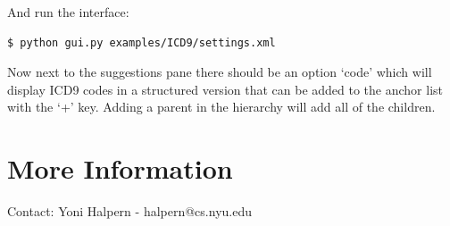 \documentclass[12pt]{article}
\begin{document}
And run the interface:
\begin{verbatim}
$ python gui.py examples/ICD9/settings.xml
\end{verbatim}

Now next to the suggestions pane there should be an option `code' which will display ICD9 codes in a structured version that can be added to the anchor list with the `+' key. Adding a parent in the hierarchy will add all of the children.

\section{More Information}
Contact: Yoni Halpern - halpern@cs.nyu.edu
\end{document}

